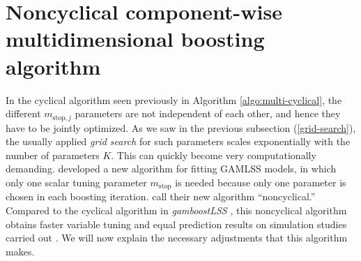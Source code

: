 \section{Noncyclical component-wise multidimensional boosting algorithm}
In the cyclical algorithm seen previously in Algorithm \ref{algo:multi-cyclical}, the different $m_{\text{stop},j}$ parameters are not independent of each other, and hence they have to be jointly optimized.
As we saw in the previous subsection (\ref{grid-search}), the usually applied \textit{grid search} for such parameters scales exponentially with the number of parameters $K$.
This can quickly become very computationally demanding.
\citet{thomas2018} developed a new algorithm for fitting GAMLSS models, in which only one scalar tuning parameter $m_{\text{stop}}$ is needed because only one parameter is chosen in each boosting iteration.
\citet{thomas2018} call their new algorithm ``noncyclical.''
Compared to the cyclical algorithm in \textit{gamboostLSS} \citep{gamboostlss-paper}, this noncyclical algorithm obtains faster variable tuning and equal prediction results on simulation studies carried out \citep{thomas2018}.
We will now explain the necessary adjustments that this algorithm makes.

